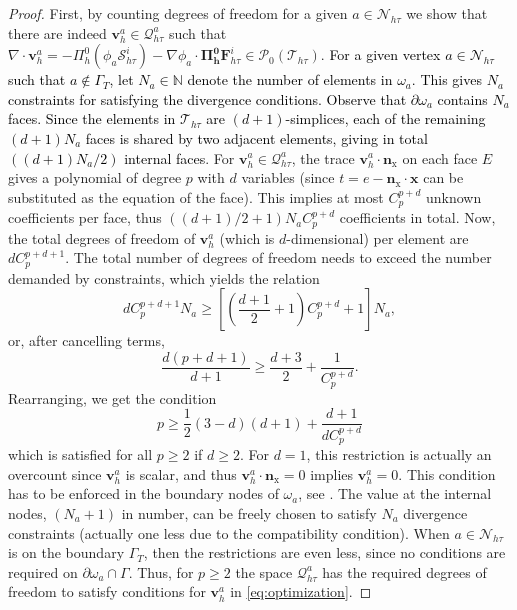 \documentclass[review,11pt]{article}
\numberwithin{equation}{section}
\def \oma {\omega_a}
\def \p  {\partial}
\def \x {{\bm{x}}}
\def \htt {{h\tau}}
\def \calN {\mathcal{N}}
\def \calP {\mathcal{P}}
\def \calQ {\bm{\mathcal{Q}}}
\def \calS {\mathcal{S}}
\def \calT {\mathcal{T}}
\def \nhat {\bm{n}_{\mathrm{x}}}
\def \Shti {\calS_\htt^i}
\def \Fhti {\bm{F}_\htt^i}
\begin{document}
\begin{proof}
First, by counting degrees of freedom for a given $a\in \calN_\htt$ we show that there are indeed $\bm{v}_h^a\in \calQ_\htt^a $ such that $\nabla\cdot \bm{v}^a_h = -\Pi_h^0 (\phi_a \Shti) - \nabla\phi_a \cdot \bm{\Pi_h^0} \Fhti\in \calP_0(\calT_\htt)$. \textcolor{black}{For a given vertex $a \in \mathcal{N}_{h\tau}$ such that $a \notin \Gamma_T$, let $N_a \in \mathbb{N}$ denote the number of elements in $\omega_a$. This gives $N_a$ constraints for satisfying the divergence conditions. Observe that $\partial\omega_a$ contains $N_a$ faces. Since the elements in $\mathcal{T}_{h\tau}$ are $(d+1)$-simplices, each of the remaining $(d+1)N_a$ faces is shared by two adjacent elements, giving in total $((d+1)N_a/2)$ internal faces}. 
For $\bm{v}_h^a\in \calQ_\htt^a$, the trace $\bm{v}^a_h\cdot \nhat$ on each face $E$ gives a polynomial of degree $p$ with $d$ variables (since $t=e-\nhat\cdot \x$ can be substituted as the equation of the face). This implies at most $C_p^{p+d}$ unknown coefficients per  face, thus $((d+1)/2 +1) N_a C_p^{p+d}$ coefficients in total. Now, the total degrees of freedom of $\bm{v}_h^a$ (which is $d$-dimensional) per element are $dC^{p+d+1}_p$. The total number of degrees of freedom needs to exceed the number demanded by constraints, which yields the relation
\[
dC^{p+d+1}_p N_a \geq \left[\left(\frac{d+1}{2} +1\right) C_p^{p+d} + 1\right]N_a,
\]
or, after cancelling terms,
\[
\frac{d(p+d+1)}{d+1}\geq \frac{d+3}{2} + \frac{1}{C_p^{p+d}}.
\]
Rearranging, we get the condition \[p\geq \frac{1}{2}(3-d)(d+1) + \frac{d+1}{d C_p^{p+d}}\]
which is satisfied for all $p\geq 2$ if $d\geq 2$. For $d=1$, this restriction is actually an overcount since $\bm{v}_h^a$ is scalar, and thus $\bm{v}^a_h\cdot \nhat=0$ implies $\bm{v}_h^a=0$. This condition has to be enforced in the boundary nodes of $\oma$, see . The value at the internal nodes, $(N_a+1)$ in number, can be freely chosen to satisfy $N_a$ divergence constraints (actually one less due to the compatibility condition). When $a\in \calN_\htt$ is on the boundary $\Gamma_T$, then the restrictions are even less, since no conditions are required on $\p\oma \cap \Gamma$. Thus, for $p\geq 2$ the space $\calQ_\htt^a$  has the required degrees of freedom to satisfy conditions for $\bm{v}_h^a$ in \eqref{eq:optimization}.


\end{proof}
\end{document}
